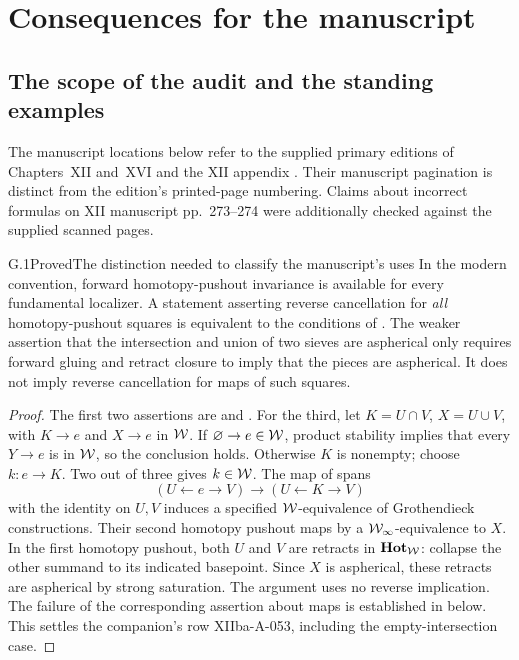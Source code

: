 \section{Consequences for the manuscript}

\subsection{The scope of the audit and the standing examples}

The manuscript locations below refer to the supplied primary editions of Chapters~XII and~XVI and the XII appendix \citep{AGGrothendieckXII,AGGrothendieckXIIAppendix,AGGrothendieckXVI}. Their manuscript pagination is distinct from the edition's printed-page numbering. Claims about incorrect formulas on XII manuscript pp.~273--274 were additionally checked against the supplied scanned pages.

\begin{claim}{G.1}{Proved}{The distinction needed to classify the manuscript's uses}
In the modern convention, forward homotopy-pushout invariance is available for every fundamental localizer. A statement asserting reverse cancellation for \emph{all} homotopy-pushout squares is equivalent to the conditions of . The weaker assertion that the intersection and union of two sieves are aspherical only requires forward gluing and retract closure to imply that the pieces are aspherical. It does not imply reverse cancellation for maps of such squares.
\end{claim}
\begin{proof}
The first two assertions are  and . For the third, let $K=U\cap V$, $X=U\cup V$, with $K\to e$ and $X\to e$ in $\mathcal{W}$. If $\varnothing\to e\in\mathcal{W}$, product stability implies that every $Y\to e$ is in $\mathcal{W}$, so the conclusion holds. Otherwise $K$ is nonempty; choose $k:e\to K$. Two out of three gives $k\in\mathcal{W}$. The map of spans
\[
(U\leftarrow e\to V)\longrightarrow(U\leftarrow K\to V)
\]
with the identity on $U,V$ induces a specified $\mathcal{W}$-equivalence of Grothendieck constructions. Their second homotopy pushout maps by a $\mathcal{W}_{\infty}$-equivalence to $X$. In the first homotopy pushout, both $U$ and $V$ are retracts in $\mathbf{Hot}_{\mathcal{W}}$: collapse the other summand to its indicated basepoint. Since $X$ is aspherical, these retracts are aspherical by strong saturation. The argument uses no reverse implication. The failure of the corresponding assertion about maps is established in  below. This settles the companion's row XIIba-A-053, including the empty-intersection case.
\end{proof}

